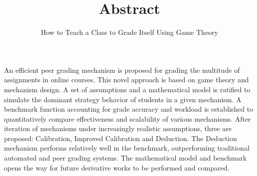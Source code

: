 \documentclass[12pt, Arial]{article}
\title{Abstract}
\author{How to Teach a Class to Grade Itself Using Game Theory}
\begin{document}
\maketitle
An efficient peer grading mechanism is proposed for grading the multitude of assignments in online courses. This novel approach is based on game theory and mechanism design. A set of assumptions and a mathematical model is ratified to simulate the dominant strategy behavior of students in a given mechanism. A benchmark function accounting for grade accuracy and workload is established to quantitatively compare effectiveness and scalability of various mechanisms. After iteration of mechanisms under increasingly realistic assumptions, three are proposed: Calibration, Improved Calibration and Deduction. The Deduction mechanism performs relatively well in the benchmark, outperforming traditional automated and peer grading systems. The mathematical model and benchmark opens the way for future derivative works to be performed and compared.
\end{document}

